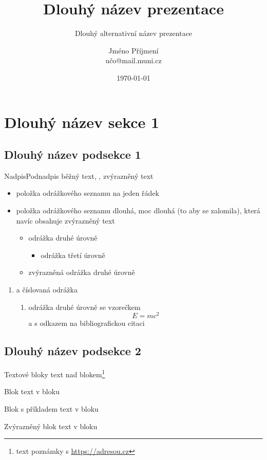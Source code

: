\documentclass[
]{beamer}
\title[Název prezentace]{Dlouhý název prezentace}
\subtitle[Alternativní název prezentace]{Dlouhý alternativní název prezentace}
\author[J.\,Příjmení]{Jméno Příjmení\texorpdfstring{\\}{, }učo@mail.muni.cz}
\institute[Archiv MU]{Archiv Masarykovy univerzity}
\date{\today}
\begin{document}
\begin{frame}[plain]
\maketitle
\end{frame}

\section[Název sekce 1]{Dlouhý název sekce 1}
\subsection[Název podsekce 1]{Dlouhý název podsekce 1}

\begin{frame}{Nadpis}{Podnadpis}
běžný text, , \alert{zvýrazněný text}
\begin{itemize}
  \item položka odrážkového seznamu na jeden řádek
  \item položka odrážkového seznamu dlouhá, moc dlouhá (to aby se zalomila),
    která navíc obsahuje \alert{zvýrazněný text}
  \begin{itemize}
    \item odrážka druhé úrovně
    \begin{itemize}
      \item odrážka třetí úrovně
    \end{itemize}
    \item \alert{zvýrazněná odrážka druhé úrovně}
  \end{itemize}
\end{itemize}
\begin{enumerate}
  \item a číslovaná odrážka
  \begin{enumerate}
    \item odrážka druhé úrovně se vzorečkem
      \[ E = mc^2 \]
      a s odkazem na bibliografickou citaci \cite{einstein1905tragheit}
  \end{enumerate}
\end{enumerate}
\end{frame}

\subsection[Název podsekce 2]{Dlouhý název podsekce 2}

\begin{frame}{Textové bloky}
text nad blokem\footnote{text poznámky s \url{https://adresou.cz}}
\begin{block}{Blok}
  text v bloku
\end{block}
\begin{exampleblock}{Blok s příkladem}
  text v bloku
\end{exampleblock}
\begin{alertblock}{Zvýrazněný blok}
  text v bloku
\end{alertblock}
\end{frame}
\end{document}
